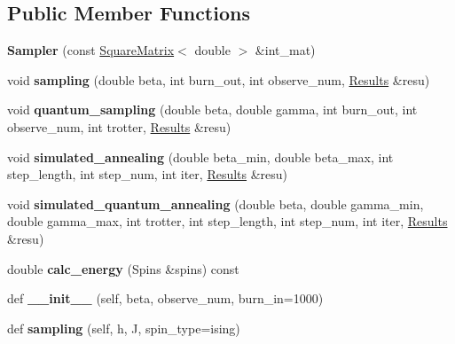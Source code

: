 \subsection*{Public Member Functions}
\begin{DoxyCompactItemize}
\item 
\mbox{\label{structopenjij_1_1sampler_1_1_sampler_ad839e27435b6accd3f8b550adb8d4820}} 
{\bfseries Sampler} (const \mbox{\hyperlink{structopenjij_1_1_square_matrix}{Square\+Matrix}}$<$ double $>$ \&int\+\_\+mat)
\item 
\mbox{\label{structopenjij_1_1sampler_1_1_sampler_a17b8c5de6849fd1fb37fdf8d6169fc8b}} 
void {\bfseries sampling} (double beta, int burn\+\_\+out, int observe\+\_\+num, \mbox{\hyperlink{structopenjij_1_1sampler_1_1_results}{Results}} \&resu)
\item 
\mbox{\label{structopenjij_1_1sampler_1_1_sampler_a8465eb3396e5f7c047d406b11fd5606a}} 
void {\bfseries quantum\+\_\+sampling} (double beta, double gamma, int burn\+\_\+out, int observe\+\_\+num, int trotter, \mbox{\hyperlink{structopenjij_1_1sampler_1_1_results}{Results}} \&resu)
\item 
\mbox{\label{structopenjij_1_1sampler_1_1_sampler_ad47f912d2b58024814beea27575c372d}} 
void {\bfseries simulated\+\_\+annealing} (double beta\+\_\+min, double beta\+\_\+max, int step\+\_\+length, int step\+\_\+num, int iter, \mbox{\hyperlink{structopenjij_1_1sampler_1_1_results}{Results}} \&resu)
\item 
\mbox{\label{structopenjij_1_1sampler_1_1_sampler_a05fc6f2e9a49af9ceaeadd291d4d3d58}} 
void {\bfseries simulated\+\_\+quantum\+\_\+annealing} (double beta, double gamma\+\_\+min, double gamma\+\_\+max, int trotter, int step\+\_\+length, int step\+\_\+num, int iter, \mbox{\hyperlink{structopenjij_1_1sampler_1_1_results}{Results}} \&resu)
\item 
\mbox{\label{structopenjij_1_1sampler_1_1_sampler_adf7c475f42d497ba19c68ae191e149dd}} 
double {\bfseries calc\+\_\+energy} (Spins \&spins) const
\item 
\mbox{\label{structopenjij_1_1sampler_1_1_sampler_ae4372fd647e3845a760dae917a9081fc}} 
def {\bfseries \+\_\+\+\_\+init\+\_\+\+\_\+} (self, beta, observe\+\_\+num, burn\+\_\+in=1000)
\item 
\mbox{\label{structopenjij_1_1sampler_1_1_sampler_a1db03787c982bb49a7a8782f826ec050}} 
def {\bfseries sampling} (self, h, J, spin\+\_\+type=\textquotesingle{}ising\textquotesingle{})
\end{DoxyCompactItemize}
